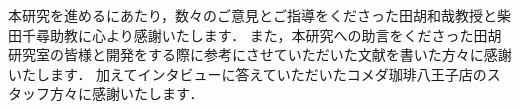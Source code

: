 
本研究を進めるにあたり，数々のご意見とご指導をくださった田胡和哉教授と柴田千尋助教に心より感謝いたします．
また，本研究への助言をくださった田胡研究室の皆様と開発をする際に参考にさせていただいた文献を書いた方々に感謝いたします．
加えてインタビューに答えていただいたコメダ珈琲八王子店のスタッフ方々に感謝いたします．